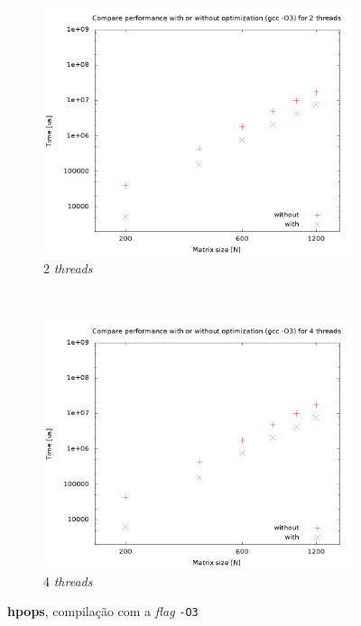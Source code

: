 \documentclass[a4paper, 12pt]{article}
\begin{document}
\begin{figure}[H]
    \centering
    \begin{subfigure}[H]{0.5\textwidth}
        \includegraphics[width=\textwidth]{hpops_cmp_optimization-2t}
        \caption{2 \textit{threads}}
        \label{fig:hpops_o3_2t}
    \end{subfigure}%
    ~ %
    \begin{subfigure}[H]{0.5\textwidth}
        \includegraphics[width=\textwidth]{hpops_cmp_optimization-4t}
        \caption{4 \textit{threads}}
        \label{fig:hpops_o3_4t}
    \end{subfigure}
    \caption{\textbf{hpops}, compilação com a \textit{flag} \texttt{-O3}}\label{fig:cmpo3}
\end{figure}
\end{document}
